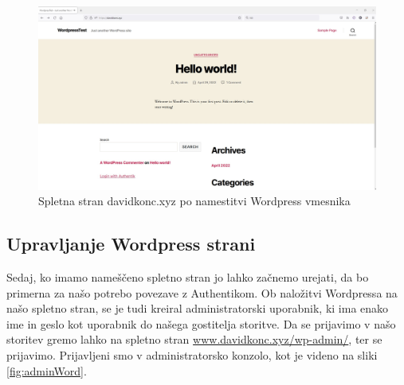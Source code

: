 \documentclass[a4paper,12pt,openright]{book}
\begin{document}
{\begin{figure}[H]
\hspace{-4cm}
\includegraphics[scale=0.50]{diploma-FRI-vzorec_11maj2021/wordpress.jpg}
\caption{Spletna stran davidkonc.xyz po namestitvi Wordpress vmesnika}
\label{fig:wordpressOsn}
\end{figure}



\subsection{Upravljanje Wordpress strani}

Sedaj, ko imamo nameščeno spletno stran jo lahko začnemo urejati, da bo primerna za našo potrebo povezave z Authentikom. Ob naložitvi Wordpressa na našo spletno stran, se je tudi kreiral administratorski uporabnik, ki ima enako ime in geslo kot uporabnik do našega gostitelja storitve. Da se prijavimo v našo storitev gremo lahko na spletno stran \href{www.davidkonc.xyz/wp-admin/}{www.davidkonc.xyz/wp-admin/}, ter se prijavimo.
\newline
Prijavljeni smo v administratorsko konzolo, kot je videno na sliki \ref{fig:adminWord}.

}
\end{document}
